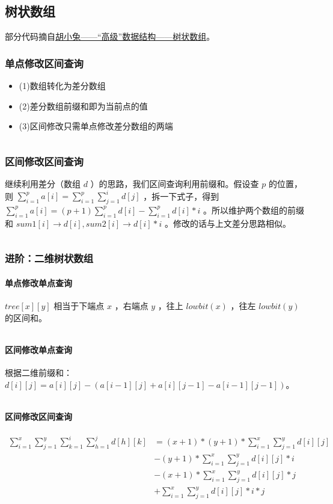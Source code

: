 \documentclass[a4paper,11pt]{article}
\begin{document}
\subsection{树状数组}
部分代码摘自\href{https://www.cnblogs.com/RabbitHu/p/BIT.html}{胡小兔------``高级''数据结构------树状数组}。
\subsubsection{单点修改区间查询}
\begin{itemize}
\item
  (1)数组转化为差分数组
\item
  (2)差分数组前缀和即为当前点的值
\item
  (3)区间修改只需单点修改差分数组的两端
\end{itemize}
\inputminted[linenos]{c++}{structure/treearray1.cpp}
\subsubsection{区间修改区间查询}
继续利用差分（数组 \(d\) ）的思路，我们区间查询利用前缀和。假设查 \(p\)
的位置，则
\(\sum\limits_{i=1}^{p}{a[i]}=\sum\limits_{i=1}^{p}\sum\limits_{j=1}^{i}{d[j]}\)
，拆一下式子，得到
\(\sum\limits_{i=1}^{p}{a[i]}=(p+1)\sum\limits_{i=1}^{p}{d[i]}-\sum\limits_{i=1}^{p}{d[i]*i}\)
。所以维护两个数组的前缀和 \(sum1[i]\to d[i],sum2[i]\to d[i]*i\)
。修改的话与上文差分思路相似。
\inputminted[linenos]{c++}{structure/treearray2.cpp}
\subsubsection{进阶：二维树状数组}
\paragraph{单点修改单点查询}
\(tree[x][y]\) 相当于下端点 \(x\) ，右端点 \(y\)
，往上 \(lowbit(x)\) ，往左 \(lowbit(y)\) 的区间和。
\inputminted[linenos]{c++}{structure/treearray3.cpp}
\paragraph{区间修改单点查询}
根据二维前缀和：\(d[i][j]=a[i][j]-(a[i - 1][j] + a[i][j - 1] - a[i - 1][j - 1])\)。
\inputminted[linenos]{c++}{structure/treearray4.cpp}
\paragraph{区间修改区间查询}
\begin{equation}
\begin{aligned}
\sum_{i=1}^{x}\sum_{j=1}^{y}\sum_{k=1}^{i}\sum_{h=1}^{j}d[h][k]&=
(x + 1) * (y + 1) * \sum_{i=1}^{x}\sum_{j=1}^{y}d[i][j]\\&- (y + 1) * \sum_{i=1}^{x}\sum_{j=1}^{y}d[i][j] * i\\&
- (x + 1) * \sum_{i=1}^{x}\sum_{j=1}^{y}d[i][j] * j\\&+ \sum_{i=1}^{x}\sum_{j=1}^{y}d[i][j] * i * j
\end{aligned}
\end{equation}
\end{document}
